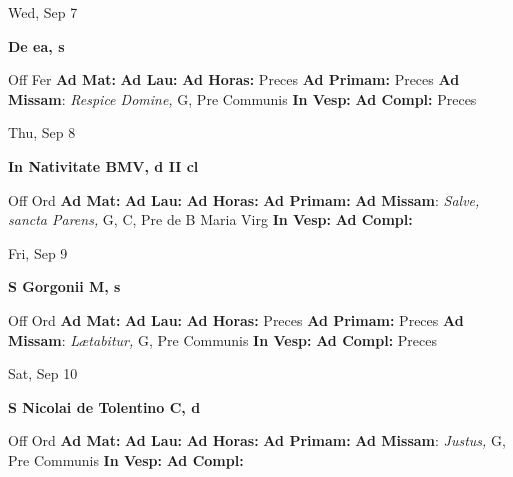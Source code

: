 \documentclass[10pt]{article}
\begin{document}
\begin{minipage}{3.5in}
\vspace{2em}\begin{center}
Wed, Sep 7
\end{center}\textbf{ \large De ea, \textnormal{\normalsize s}}
\begin{justify}
Off Fer
\textbf{Ad Mat: }
\textbf{Ad Lau: }
\textbf{Ad Horas: }Preces
\textbf{Ad Primam: }Preces
\textbf{Ad Missam}: \textit{Respice Domine,} G, Pre Communis
\textbf{In Vesp: }
\textbf{Ad Compl: }Preces\end{justify}
\end{minipage}



\begin{minipage}{3.5in}
\vspace{2em}\begin{center}
Thu, Sep 8
\end{center}\textbf{ \large In Nativitate BMV, \textnormal{\normalsize d II cl}}
\begin{justify}
Off Ord
\textbf{Ad Mat: }
\textbf{Ad Lau: }
\textbf{Ad Horas: }
\textbf{Ad Primam: }
\textbf{Ad Missam}: \textit{Salve, sancta Parens,} G, C, Pre de B Maria Virg
\textbf{In Vesp: }
\textbf{Ad Compl: }\end{justify}
\end{minipage}



\begin{minipage}{3.5in}
\vspace{2em}\begin{center}
Fri, Sep 9
\end{center}\textbf{ \large S Gorgonii M, \textnormal{\normalsize s}}
\begin{justify}
Off Ord
\textbf{Ad Mat: }
\textbf{Ad Lau: }
\textbf{Ad Horas: }Preces
\textbf{Ad Primam: }Preces
\textbf{Ad Missam}: \textit{Lætabitur,} G, Pre Communis
\textbf{In Vesp: }
\textbf{Ad Compl: }Preces\end{justify}
\end{minipage}



\begin{minipage}{3.5in}
\vspace{2em}\begin{center}
Sat, Sep 10
\end{center}\textbf{ \large S Nicolai de Tolentino C, \textnormal{\normalsize d}}
\begin{justify}
Off Ord
\textbf{Ad Mat: }
\textbf{Ad Lau: }
\textbf{Ad Horas: }
\textbf{Ad Primam: }
\textbf{Ad Missam}: \textit{Justus,} G, Pre Communis
\textbf{In Vesp: }
\textbf{Ad Compl: }\end{justify}
\end{minipage}
\end{document}
